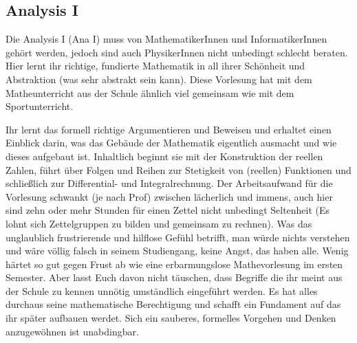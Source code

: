 \subsection{Analysis I}
\label{ana1}

Die Analysis I (Ana I) muss von MathematikerInnen und InformatikerInnen gehört werden, jedoch sind auch PhysikerInnen nicht unbedingt schlecht beraten. Hier lernt ihr richtige, fundierte Mathematik in all ihrer Schönheit und Abstraktion (was sehr abstrakt sein kann). Diese Vorlesung hat mit dem Matheunterricht aus der Schule ähnlich viel gemeinsam wie mit dem Sportunterricht.

Ihr lernt das formell richtige Argumentieren und Beweisen und erhaltet einen Einblick darin, was das Gebäude der Mathematik eigentlich ausmacht und wie dieses aufgebaut ist. Inhaltlich beginnt sie mit der Konstruktion der reellen Zahlen, führt über Folgen und Reihen zur Stetigkeit von (reellen) Funktionen und schließlich zur Differential- und Integralrechnung. Der Arbeitsaufwand für die Vorlesung schwankt (je nach Prof) zwischen lächerlich und immens, auch hier sind zehn oder mehr Stunden für einen Zettel nicht unbedingt Seltenheit (Es lohnt sich Zettelgruppen zu bilden und gemeinsam zu rechnen). Was das unglaublich frustrierende und hilflose Gefühl betrifft, man würde nichts verstehen und wäre völlig falsch in seinem Studiengang, keine Angst, das haben alle. Wenig härtet so gut gegen Frust ab wie eine erbarmungslose Mathevorlesung im ersten Semester. Aber lasst Euch davon nicht täuschen, dass Begriffe die ihr meint aus der Schule zu kennen unnötig umständlich eingeführt werden. Es hat alles durchaus seine mathematische Berechtigung und schafft ein Fundament auf das ihr später aufbauen werdet. Sich ein sauberes, formelles Vorgehen und Denken anzugewöhnen ist unabdingbar.
